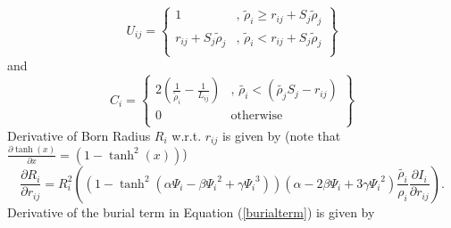 \documentclass[12pt]{article}
\begin{document}
\begin{equation}
\label{Uijeqn}
U_{ij} = \left\{ \begin{array}{rl}
      1 &\mbox{, $\tilde{\rho}_{i} {\geq} r_{ij} + S_{j}\tilde{\rho}_{j}$} \\
      r_{ij} + S_{j}\tilde{\rho}_{j} &\mbox {, $\tilde{\rho}_{i} < r_{ij} + S_{j}\tilde{\rho}_{j}$} \\
          \end{array} \right\}      
\end{equation}
and
\begin{equation}
\label{Cijeqn}
C_{i} = \left\{ \begin{array}{rl}
   2(\frac{1}{\tilde{\rho}_{i}} - \frac{1}{L_{ij}}) &\mbox{, $\tilde{{\rho}_{i}} < ( \tilde{{\rho}_{j}}S_{j} - r_{ij})$} \\
   0 &\mbox{otherwise} \\
           \end{array} \right\}
\end{equation}
Derivative of Born Radius $R_{i}$ w.r.t. $r_{ij}$ is given by
(note that $\frac{\partial \tanh(x)}{\partial x} = (1-\tanh^{2}(x))$)
\begin{equation}
\label{bornradiiderivative}
\frac{\partial R_{i}}{\partial r_{ij}} = R_{i}^{2}\left((1 - {\tanh}^{2}({{\alpha}{\Psi_{i}} - {\beta}{\Psi_{i}}^{2} + {\gamma}
     {\Psi_{i}}^{3}}))({\alpha} - 2{\beta}{\Psi_{i}} + 3{\gamma}{\Psi_{i}}^{2})
     \frac{\tilde{\rho_{i}}}{\rho_{i}}\frac{\partial {I_{i}}}{\partial r_{ij}}
     \right).
\end{equation}
Derivative of the burial term in Equation (\ref{burialterm}) is given by
\end{document}
